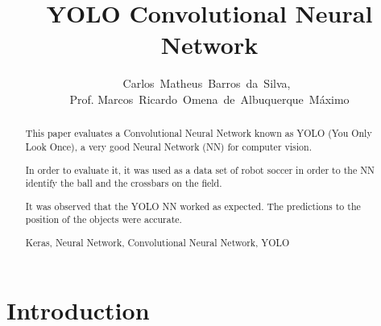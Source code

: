 \documentclass[journal,12pt,onecolumn,draftclsnofoot,]{IEEEtran}
\begin{document}
    \title{YOLO Convolutional Neural Network}
  \author{Carlos~Matheus~Barros~da~Silva,~\\Prof. Marcos~Ricardo~Omena~de~Albuquerque~Máximo}


\maketitle


\begin{abstract}

This paper evaluates a Convolutional Neural Network known as YOLO (You Only Look Once), a very good Neural Network (NN) for computer vision.

In order to evaluate it, it was used as a data set of robot soccer in order to the NN identify the ball and the crossbars on the field.

It was observed that the YOLO NN worked as expected. The predictions to the position of the objects were accurate.

\begin{IEEEkeywords}
    Keras, Neural Network, Convolutional Neural Network, YOLO
\end{IEEEkeywords}
\end{abstract}

\IEEEpeerreviewmaketitle



\section{Introduction}
\end{document}
